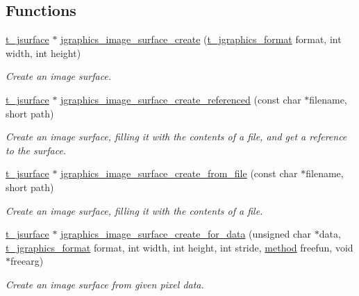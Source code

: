 \subsection*{Functions}
\begin{DoxyCompactItemize}
\item 
\hyperlink{group__jsurface_ga9ced037ee8d6676fcd561e1d3420c28b}{t\_\-jsurface} $\ast$ \hyperlink{group__jsurface_gaee5d0e140bdbece63abd62d60f44f96d}{jgraphics\_\-image\_\-surface\_\-create} (\hyperlink{group__jgraphics_ga4c4fa437dbfffb2c406787efa7701604}{t\_\-jgraphics\_\-format} format, int width, int height)
\begin{DoxyCompactList}\small\item\em Create an image surface. \item\end{DoxyCompactList}\item 
\hyperlink{group__jsurface_ga9ced037ee8d6676fcd561e1d3420c28b}{t\_\-jsurface} $\ast$ \hyperlink{group__jsurface_ga0aadea6674e22465d5d81148c8675d61}{jgraphics\_\-image\_\-surface\_\-create\_\-referenced} (const char $\ast$filename, short path)
\begin{DoxyCompactList}\small\item\em Create an image surface, filling it with the contents of a file, and get a reference to the surface. \item\end{DoxyCompactList}\item 
\hyperlink{group__jsurface_ga9ced037ee8d6676fcd561e1d3420c28b}{t\_\-jsurface} $\ast$ \hyperlink{group__jsurface_ga5b9a625daaa6d39d5fe538b714ae1c6f}{jgraphics\_\-image\_\-surface\_\-create\_\-from\_\-file} (const char $\ast$filename, short path)
\begin{DoxyCompactList}\small\item\em Create an image surface, filling it with the contents of a file. \item\end{DoxyCompactList}\item 
\hyperlink{group__jsurface_ga9ced037ee8d6676fcd561e1d3420c28b}{t\_\-jsurface} $\ast$ \hyperlink{group__jsurface_ga315abd7050ef53566df8fbcec80182af}{jgraphics\_\-image\_\-surface\_\-create\_\-for\_\-data} (unsigned char $\ast$data, \hyperlink{group__jgraphics_ga4c4fa437dbfffb2c406787efa7701604}{t\_\-jgraphics\_\-format} format, int width, int height, int stride, \hyperlink{group__datatypes_gac26ba0a173b50597f5738132e059b42d}{method} freefun, void $\ast$freearg)
\begin{DoxyCompactList}\small\item\em Create an image surface from given pixel data. \item\end{DoxyCompactList}\item 

\end{DoxyCompactItemize}
